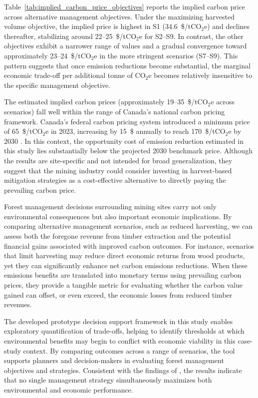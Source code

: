 \documentclass[preprint,12pt]{elsarticle}
\begin{document}
Table~\ref{tab:implied_carbon_price_objectives} reports the implied carbon price 
across alternative management objectives. 
Under the maximizing harvested volume objective, the implied price is highest in S1 
(34.6~\$/tCO$_2$e) and declines thereafter, stabilizing around 22--25~\$/tCO$_2$e 
for S2--S9. In contrast, the other objectives exhibit a narrower range of values and a gradual 
convergence toward approximately 23--24~\$/tCO$_2$e in the more stringent 
scenarios (S7--S9). This pattern suggests that once emission reductions become 
substantial, the marginal economic trade-off per additional tonne of CO$_2$e 
becomes relatively insensitive to the specific management objective. 

The estimated implied carbon prices (approximately 19--35~\$/tCO$_2$e across 
scenarios) fall well within the range of Canada's national carbon pricing 
framework. Canada's federal carbon pricing system introduced a minimum price 
of 65~\$/tCO$_2$e in 2023, increasing by 15~\$ annually to reach 
170~\$/tCO$_2$e by 2030 \citep{CanadaCarbonPricing2023}. In this context, the opportunity cost of emission reduction estimated in this study lies substantially below the projected 2030 benchmark price. Although the results are site-specific and not intended for broad generalization, they suggest that the mining industry could consider investing in harvest-based mitigation strategies as a cost-effective alternative to directly paying the prevailing carbon price.

Forest management decisions surrounding mining sites carry not only environmental consequences but also important economic implications. By comparing alternative management scenarios, such as reduced harvesting, we can assess both the foregone revenue from timber extraction and the potential financial gains associated with improved carbon outcomes. For instance, scenarios that limit harvesting may reduce direct economic returns from wood products, yet they can significantly enhance net carbon emissions reductions. When these emissions benefits are translated into monetary terms using prevailing carbon prices, they provide a tangible metric for evaluating whether the carbon value gained can offset, or even exceed, the economic losses from reduced timber revenues.

The developed prototype decision support framework in this study enables exploratory quantification of trade-offs, helping to identify thresholds at which environmental benefits may begin to conflict with economic viability in this case-study context. By comparing outcomes across a range of scenarios, the tool supports planners and decision-makers in evaluating forest management objectives and strategies. Consistent with the findings of \citet{Hiltunen2021}, the results indicate that no single management strategy simultaneously maximizes both environmental and economic performance. 
\end{document}
